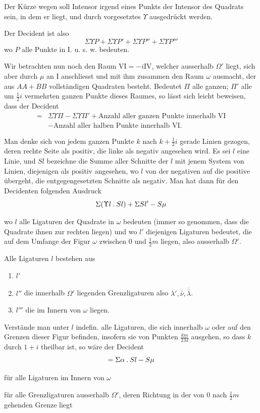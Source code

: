 Der Kürze wegen soll Intensor irgend eines Punkts der Intensor des Quadrats sein, in dem er liegt, und durch vorgesetztes $\Upsilon$ ausgedrückt werden.

Der Decident ist also
\[
\Sigma\Upsilon P+\Sigma\Upsilon P'+\Sigma\Upsilon P''+\Sigma\Upsilon P'''
\]
wo $P$ alle Punkte in I. u. s. w. bedeuten.

%
Wir betrachten nun noch den Raum $\mathrm{VI}=-i\mathrm{IV}$, welcher ausserhalb $\Omega'$ liegt, sich aber durch $\mu$ an I anschliesst und mit ihm zusammen den Raum $\omega$ ausmacht, der aus $AA+BB$ vollständigen Quadraten besteht. Bedeutet $\Pi$ alle ganzen; $\Pi'$ alle um $\frac12i$ vermehrten ganzen Punkte dieses Raumes, so lässt sich leicht beweisen, dass der Decident
\[
\begin{aligned}
={}&\Sigma\Upsilon\Pi-\Sigma\Upsilon\Pi'+\text{Anzahl aller ganzen Punkte innerhalb VI}\\
&-\text{Anzahl aller halben Punkte innerhalb VI.}
\end{aligned}
\]

Man denke sich von jedem ganzen Punkte $k$ nach $k+\frac12i$ gerade Linien gezogen, deren rechte Seite als positiv, die linke als negativ angesehen wird. Es sei $l$ eine Linie, und $Sl$ bezeichne die Summe aller Schnitte der $l$ mit jenem System von Linien, diejenigen als positiv angesehen, wo $l$ von der negativen auf die positive übergeht, die entgegengesetzten Schnitte als negativ. Man hat dann für den Decidenten folgenden Ausdruck
\[
\Sigma(\Upsilon l\mathbin{.} Sl)+\Sigma Sl'-S\mu
\]

wo $l$ alle Ligaturen der Quadrate in $\omega$ bedeuten (immer so genommen, dass die Quadrate ihnen zur rechten liegen) und wo $l'$ diejenigen Ligaturen bedeutet, die auf dem Umfange der Figur $\omega$ zwischen $0$ und $\frac12m$ liegen, also ausserhalb $\Omega'$.

Alle Ligaturen $l$ bestehen aus
\begin{enumerate}
\item[1)] $l'$
\item[2)] $l''$ die innerhalb $\Omega'$ liegenden Grenzligaturen also $\lambda',\overline{\overline\nu},\overline{\overline\lambda}$.
\item[3)] $l'''$ die im Innern von $\omega$ liegen.
\end{enumerate}
Verstände man unter $l$ indefin. alle Ligaturen, die sich innerhalb $\omega$ oder auf den Grenzen dieser Figur befinden, insofern sie von Punkten $\frac{km}{2M}$ ausgehen, so dass $k$ durch $1+i$ theilbar ist, so wäre der Decident
\[
=\Sigma\alpha\mathbin{.} Sl-S\mu
\]

\begin{list}{}{\setlength{\labelwidth}{5em}\setlength{\leftmargin}{5.5em}}
\item[wo $\alpha=1$] für alle Ligaturen im Innern von $\omega$
\item[$\alpha=\Upsilon l+1$] für alle Grenzligaturen ausserhalb $\Omega'$, deren Richtung in der von $0$ nach $\frac12m$ gehenden Grenze liegt
\end{list}

